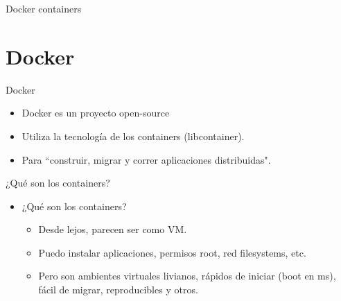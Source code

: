 \documentclass[compress]{beamer}
\begin{document}
\begin{frame}{Docker containers}
	\begin{figure}
		\centering
{}
	\end{figure}
\end{frame}


%
%
\section{Docker}

\begin{frame}{Docker}
	\begin{itemize}
		\item Docker es un proyecto open-source
		\item Utiliza la tecnología de los containers (libcontainer).
		\item Para ``construir, migrar y correr aplicaciones distribuidas".
	\end{itemize}

\end{frame}

\begin{frame}{¿Qué son los containers?}
	\begin{itemize}
		\item ¿Qué son los containers?
			\begin{itemize}
				\item Desde lejos, parecen ser como VM.
				\item Puedo instalar aplicaciones, permisos root, red filesystems, etc.
				\item Pero son ambientes virtuales livianos, rápidos de iniciar (boot en ms), fácil de migrar, reproducibles y otros.
			\end{itemize}
	\end{itemize}
\end{frame}


\begin{frame}{}
	\begin{figure}
		\centering
	\end{figure}
\end{frame}
\end{document}
